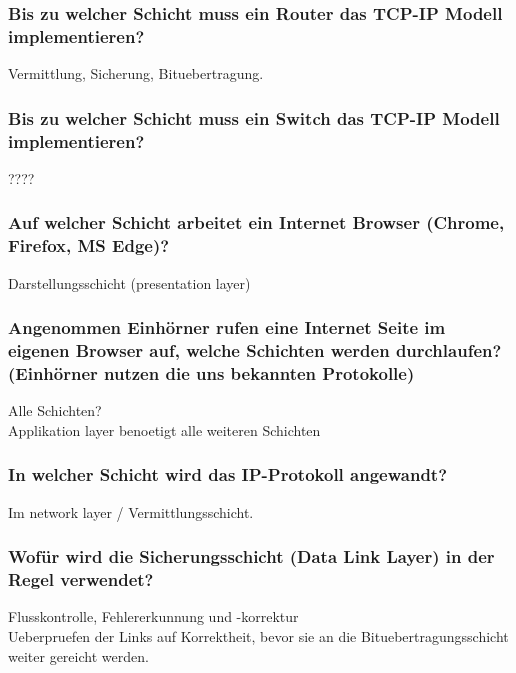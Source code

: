 \documentclass{article}
\begin{document}
\subsubsection{Bis zu welcher Schicht muss ein Router das TCP-IP Modell implementieren?}
Vermittlung, Sicherung, Bituebertragung.\\

\subsubsection{Bis zu welcher Schicht muss ein Switch das TCP-IP Modell implementieren?}
????

\subsubsection{Auf welcher Schicht arbeitet ein Internet Browser (Chrome, Firefox, MS Edge)?}
Darstellungsschicht (presentation layer)\\

\subsubsection{
Angenommen Einhörner rufen eine Internet Seite im eigenen Browser auf, 
welche Schichten werden durchlaufen? (Einhörner nutzen die uns bekannten Protokolle)
}
Alle Schichten?\\
Applikation layer benoetigt alle weiteren Schichten\\

\subsubsection{In welcher Schicht wird das IP-Protokoll angewandt?}
Im network layer / Vermittlungsschicht.\\

\subsubsection{Wofür wird die Sicherungsschicht (Data Link Layer) in der Regel verwendet?}
Flusskontrolle, Fehlererkunnung und -korrektur\\
Ueberpruefen der Links auf Korrektheit, bevor sie an die Bituebertragungsschicht weiter
gereicht werden.\\
\end{document}
